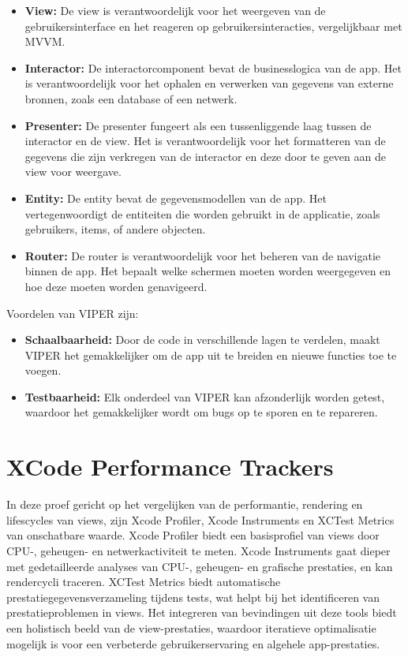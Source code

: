 \begin{itemize}
    \item {\textbf{View:} De view is verantwoordelijk voor het weergeven van de gebruikersinterface en het reageren op gebruikersinteracties, vergelijkbaar met MVVM.}
    \item {\textbf{Interactor:} De interactorcomponent bevat de businesslogica van de app. Het is verantwoordelijk voor het ophalen en verwerken van gegevens van externe bronnen, zoals een database of een netwerk.}
    \item {\textbf{Presenter:} De presenter fungeert als een tussenliggende laag tussen de interactor en de view. Het is verantwoordelijk voor het formatteren van de gegevens die zijn verkregen van de interactor en deze door te geven aan de view voor weergave.}
    \item {\textbf{Entity:} De entity bevat de gegevensmodellen van de app. Het vertegenwoordigt de entiteiten die worden gebruikt in de applicatie, zoals gebruikers, items, of andere objecten.}
    \item {\textbf{Router:} De router is verantwoordelijk voor het beheren van de navigatie binnen de app. Het bepaalt welke schermen moeten worden weergegeven en hoe deze moeten worden genavigeerd.}
\end{itemize}
Voordelen van VIPER zijn:
\begin{itemize}
    \item {\textbf{Schaalbaarheid:} Door de code in verschillende lagen te verdelen, maakt VIPER het gemakkelijker om de app uit te breiden en nieuwe functies toe te voegen.}
    \item {\textbf{Testbaarheid:} Elk onderdeel van VIPER kan afzonderlijk worden getest, waardoor het gemakkelijker wordt om bugs op te sporen en te repareren.}
\end{itemize}

\section{XCode Performance Trackers}

In deze proef gericht op het vergelijken van de performantie, rendering en lifescycles van views, zijn Xcode Profiler, Xcode Instruments en XCTest Metrics van onschatbare waarde. Xcode Profiler biedt een basisprofiel van views door CPU-, geheugen- en netwerkactiviteit te meten. Xcode Instruments gaat dieper met gedetailleerde analyses van CPU-, geheugen- en grafische prestaties, en kan rendercycli traceren. XCTest Metrics biedt automatische prestatiegegevensverzameling tijdens tests, wat helpt bij het identificeren van prestatieproblemen in views. Het integreren van bevindingen uit deze tools biedt een holistisch beeld van de view-prestaties, waardoor iteratieve optimalisatie mogelijk is voor een verbeterde gebruikerservaring en algehele app-prestaties.

